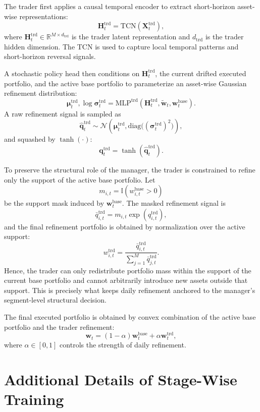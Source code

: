 \documentclass[letterpaper]{article} %
\begin{document}
The trader first applies a causal temporal encoder to extract short-horizon asset-wise representations:
\[
\mathbf{H}^{\mathrm{trd}}_t
=
\mathrm{TCN}\!\left(\mathbf{X}^{\mathrm{trd}}_t\right),
\]
where \(\mathbf{H}^{\mathrm{trd}}_t\in\mathbb{R}^{M\times d_{\mathrm{trd}}}\) is the trader latent representation and \(d_{\mathrm{trd}}\) is the trader hidden dimension. The TCN is used to capture local temporal patterns and short-horizon reversal signals.

A stochastic policy head then conditions on \(\mathbf{H}^{\mathrm{trd}}_t\), the current drifted executed portfolio, and the active base portfolio to parameterize an asset-wise Gaussian refinement distribution:
\[
\boldsymbol{\mu}^{\mathrm{trd}}_t,\log \boldsymbol{\sigma}^{\mathrm{trd}}_t
=
\mathrm{MLP}^{\mathrm{trd}}\!\left(
\mathbf{H}^{\mathrm{trd}}_t,
\tilde{\mathbf{w}}_t,
\mathbf{w}^{\mathrm{base}}_t
\right).
\]
A raw refinement signal is sampled as
\[
\hat{\mathbf{q}}^{\mathrm{trd}}_t
\sim
\mathcal{N}\!\left(
\boldsymbol{\mu}^{\mathrm{trd}}_t,
\mathrm{diag}\bigl((\boldsymbol{\sigma}^{\mathrm{trd}}_t)^2\bigr)
\right),
\]
and squashed by \(\tanh(\cdot)\):
\[
\mathbf{q}^{\mathrm{trd}}_t
=
\tanh\!\left(\hat{\mathbf{q}}^{\mathrm{trd}}_t\right).
\]

To preserve the structural role of the manager, the trader is constrained to refine only the support of the active base portfolio. Let
\[
m_{i,t}
=
\mathbb{I}\!\left(w_{i,t}^{\mathrm{base}}>0\right)
\]
be the support mask induced by \(\mathbf{w}^{\mathrm{base}}_t\). The masked refinement signal is
\[
\bar{q}_{i,t}^{\mathrm{trd}}
=
m_{i,t}\exp(q_{i,t}^{\mathrm{trd}}),
\]
and the final refinement portfolio is obtained by normalization over the active support:
\[
w_{i,t}^{\mathrm{trd}}
=
\frac{\bar{q}_{i,t}^{\mathrm{trd}}}
{\sum_{j=1}^{M}\bar{q}_{j,t}^{\mathrm{trd}}}.
\]
Hence, the trader can only redistribute portfolio mass within the support of the current base portfolio and cannot arbitrarily introduce new assets outside that support. This is precisely what keeps daily refinement anchored to the manager's segment-level structural decision.

The final executed portfolio is obtained by convex combination of the active base portfolio and the trader refinement:
\[
\mathbf{w}_t
=
(1-\alpha)\mathbf{w}^{\mathrm{base}}_t
+
\alpha\mathbf{w}^{\mathrm{trd}}_t,
\]
where \(\alpha\in[0,1]\) controls the strength of daily refinement.

\section{Additional Details of Stage-Wise Training}
\label{app:hier_training}
\end{document}
